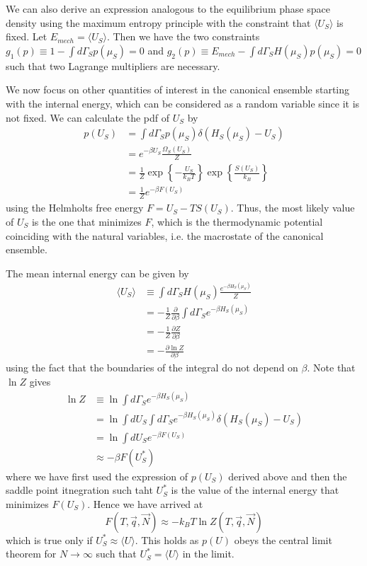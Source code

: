 \documentclass[12pt, a4paper, oneside, openright, titlepage]{book}
\begin{document}
We can also derive an expression analogous to the equilibrium phase space density using the maximum entropy principle with the constraint that $\langle U_S\rangle$ is fixed. Let $E_{mech} = \langle U_S\rangle$. Then we have the two constraints $g_1(p) \equiv 1 - \int d\Gamma_Sp(\mu_S) = 0$ and $g_2(p) \equiv E_{mech} - \int d\Gamma_SH(\mu_S)p(\mu_S) = 0$ such that two Lagrange multipliers are necessary. 


We now focus on other quantities of interest in the canonical ensemble starting with the internal energy, which can be considered as a random variable since it is not fixed. We can calculate the pdf of $U_S$ by \begin{align*}
    p(U_S) &= \int d\Gamma_Sp(\mu_S)\delta(H_S(\mu_S) - U_S) \\
    &= e^{-\beta U_S}\frac{\Omega_S(U_S)}{Z} \\
    &= \frac{1}{Z}\exp\left\{-\frac{U_S}{k_BT}\right\}\exp\left\{\frac{S(U_S)}{k_B}\right\} \\
    &= \frac{1}{Z}e^{-\beta F(U_S)} 
\end{align*}
using the Helmholts free energy $F = U_S - TS(U_S)$. Thus, the most likely value of $U_S$ is the one that minimizes $F$, which is the thermodynamic potential coinciding with the natural variables, i.e. the macrostate of the canonical ensemble.

The mean internal energy can be given by \begin{align*}
    \langle U_S\rangle &\equiv \int d\Gamma_SH(\mu_S)\frac{e^{-\beta H_S(\mu_S)}}{Z} \\
    &= -\frac{1}{Z}\frac{\partial}{\partial \beta}\int d\Gamma_Se^{-\beta H_S(\mu_S)} \\
    &= - \frac{1}{Z}\frac{\partial Z}{\partial \beta} \\
    &= -\frac{\partial \ln Z}{\partial \beta}
\end{align*}
using the fact that the boundaries of the integral do not depend on $\beta$. Note that $\ln Z$ gives \begin{align*}
    \ln Z &\equiv \ln\int d\Gamma_Se^{-\beta H_S(\mu_S)} \\
    &= \ln\int dU_S\int d\Gamma_Se^{-\beta H_S(\mu_S)}\delta(H_S(\mu_S) - U_S) \\
    &= \ln\int dU_Se^{-\beta F(U_S)} \\
    &\approx -\beta F(U^*_S)
\end{align*}
where we have first used the expression of $p(U_S)$ derived above and then the saddle point itnegration such taht $U^*_S$ is the value of the internal energy that minimizes $F(U_S)$. Hence we have arrived at \begin{equation*}
    F(T,\vec{q},\vec{N}) \approx -k_BT\ln Z(T,\vec{q},\vec{N})
\end{equation*}
which is true only if $U_S^* \approx \langle U\rangle$. This holds as $p(U)$ obeys the central limit theorem for $N\rightarrow \infty$ such that $U_S^* = \langle U\rangle$ in the limit.
\end{document}
